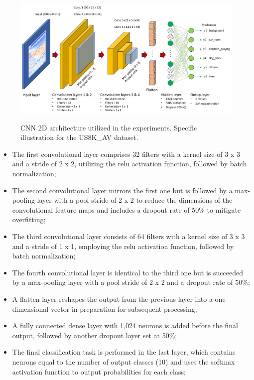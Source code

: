 \begin{figure}[htbp]
    \raggedright
        \caption{CNN 2D architecture utilized in the experiments. Specific illustration for the US8K\_AV dataset.}
        \includegraphics[width=1\textwidth]{resources/images/050-methods/Methods_training_CNN2D_architecture.jpg}
        \label{fig:methods_training_CNN_2D_architecture}
\end{figure} 

\begin{itemize}
    \item The first convolutional layer comprises 32 filters with a kernel size of 3 x 3 and a stride of 2 x 2, utilizing the \gls{relu} activation function, followed by batch normalization;
    \item The second convolutional layer mirrors the first one but is followed by a max-pooling layer with a pool stride of 2 x 2 to reduce the dimensions of the convolutional feature maps and includes a dropout rate of 50\% to mitigate overfitting;
    \item The third convolutional layer consists of 64 filters with a kernel size of 3 x 3 and a stride of 1 x 1, employing the \gls{relu} activation function, followed by batch normalization;
    \item The fourth convolutional layer is identical to the third one but is succeeded by a max-pooling layer with a pool stride of 2 x 2 and a dropout rate of 50\%;
    \item A flatten layer reshapes the output from the previous layer into a one-dimensional vector in preparation for subsequent processing;
    \item A fully connected dense layer with 1,024 neurons is added before the final output, followed by another dropout layer set at 50\%;
    \item The final classification task is performed in the last layer, which contains neurons equal to the number of output classes (10) and uses the softmax activation function to output probabilities for each class;
\end{itemize}

